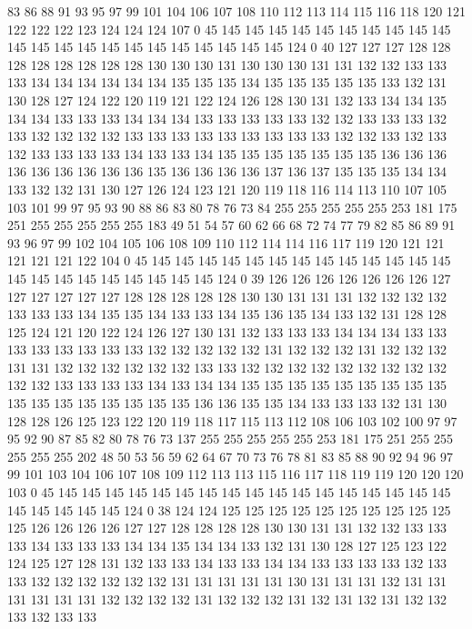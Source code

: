 83 86 88 91 93 95 97 99 101 104 106 107 108 110 112 113 114 115 116 118
120 121 122 122 122 123 124 124 124 107 0 45 145 145 145 145 145 145 145 145
145 145 145 145 145 145 145 145 145 145 145 145 145 145 124 0 40 127 127 127
128 128 128 128 128 128 128 128 130 130 130 131 130 130 130 131 131 132 132 133
133 133 134 134 134 134 134 134 135 135 135 134 135 135 135 135 135 133 132 131
130 128 127 124 122 120 119 121 122 124 126 128 130 131 132 133 134 134 135 134
134 133 133 133 134 134 134 133 133 133 133 133 132 132 133 133 133 132 133 132
132 132 132 133 133 133 133 133 133 133 133 133 132 132 133 132 133 132 133 133
133 133 134 133 133 134 135 135 135 135 135 135 135 136 136 136 136 136 136 136
136 136 135 136 136 136 136 137 136 137 135 135 135 134 134 133 132 132 131 130
127 126 124 123 121 120 119 118 116 114 113 110 107 105 103 101 99 97 95 93
90 88 86 83 80 78 76 73 84 255 255 255 255 255 253 181 175 251 255 255
255 255 255 183 49 51 54 57 60 62 66 68 72 74 77 79 82 85 86 89
91 93 96 97 99 102 104 105 106 108 109 110 112 114 114 116 117 119 120 121
121 121 121 121 122 104 0 45 145 145 145 145 145 145 145 145 145 145 145 145
145 145 145 145 145 145 145 145 145 145 124 0 39 126 126 126 126 126 126 126
127 127 127 127 127 127 128 128 128 128 128 130 130 131 131 131 132 132 132 132
133 133 133 134 135 135 134 133 133 134 135 136 135 134 133 132 131 128 128 125
124 121 120 122 124 126 127 130 131 132 133 133 133 134 134 134 133 133 133 133
133 133 133 133 132 132 132 132 132 131 132 132 132 131 132 132 132 131 131 132
132 132 132 132 132 133 133 132 132 132 132 132 132 132 132 132 132 132 133 133
133 133 134 133 134 134 135 135 135 135 135 135 135 135 135 135 135 135 135 135
135 135 135 136 136 135 135 134 133 133 133 132 131 130 128 128 126 125 123 122
120 119 118 117 115 113 112 108 106 103 102 100 97 97 95 92 90 87 85 82
80 78 76 73 137 255 255 255 255 255 253 181 175 251 255 255 255 255 255 202
48 50 53 56 59 62 64 67 70 73 76 78 81 83 85 88 90 92 94 96
97 99 101 103 104 106 107 108 109 112 113 113 115 116 117 118 119 119 120 120
120 103 0 45 145 145 145 145 145 145 145 145 145 145 145 145 145 145 145 145
145 145 145 145 145 145 124 0 38 124 124 125 125 125 125 125 125 125 125 125
125 125 126 126 126 126 127 127 128 128 128 128 130 130 131 131 132 132 133 133
133 134 133 133 133 134 134 135 134 134 133 132 131 130 128 127 125 123 122 124
125 127 128 131 132 133 133 134 133 133 134 134 133 133 133 133 132 133 133 132
132 132 132 132 132 131 131 131 131 131 130 131 131 131 132 131 131 131 131 131
131 132 132 132 132 131 132 132 132 131 132 131 132 131 132 132 133 132 133 133
